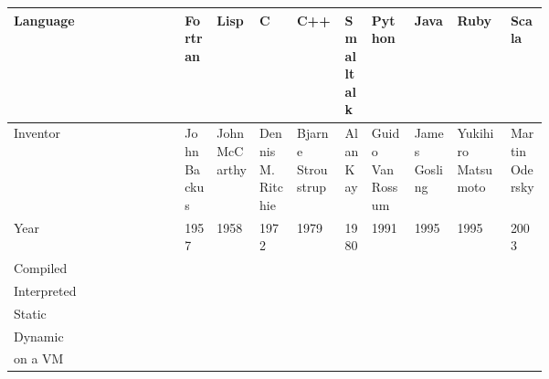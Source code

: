 \documentclass[12pt, a4paper]{article}
\newcommand{\cmark}{\textcolor{green!65!black}{\ding{51}}}
\newcommand{\xmark}{\textcolor{red!90!black}{\ding{55}}}
\begin{document}
{\tiny
\noindent\begin{tabular}{lp{0.06\linewidth}p{0.08\linewidth}p{0.07\linewidth}p{0.09\linewidth}p{0.05\linewidth}p{0.08\linewidth}p{0.08\linewidth}p{0.1\linewidth}p{0.07\linewidth}}
    Language    & Fortran     & Lisp          & C                 & C++               & Smalltalk & Python           & Java          & Ruby               & Scala \\
    \toprule
    Inventor    & John Backus & John McCarthy & Dennis M. Ritchie & Bjarne Stroustrup & Alan Kay  & Guido Van Rossum & James Gosling & Yukihiro Matsumoto & Martin Odersky \\
    \midrule
    Year        & 1957        & 1958          & 1972              & 1979              & 1980      & 1991             & 1995          & 1995               & 2003 \\
    \midrule
    Compiled    & \cmark{}    & \xmark{}      & \cmark{}          & \cmark{}          & \cmark{}  & \cmark{}         & \cmark{}      & \xmark{}           & \cmark{} \\
    \midrule
    Interpreted & \xmark{}    & \cmark{}      & \xmark{}          & \xmark{}          & \xmark{}  & \cmark{}         & \cmark{}      & \cmark{}           & \cmark{} \\
    \midrule
    Static      & \cmark{}    & \xmark{}      & \cmark{}          & \cmark{}          & \xmark{}  & \xmark{}         & \cmark{}      & \xmark{}           & \cmark{} \\
    \midrule
    Dynamic     & \xmark{}    & \cmark{}      & \xmark{}          & \xmark{}          & \cmark{}  & \cmark{}         & \xmark{}      & \cmark{}           & \xmark{} \\
    \midrule
    on a VM     &             &               & \xmark{}          & \xmark{}          & \cmark{}  & \cmark{}         & \cmark{}      & \cmark{}           & \cmark{} \\
    \bottomrule
\end{tabular}
}



  
\end{document}

